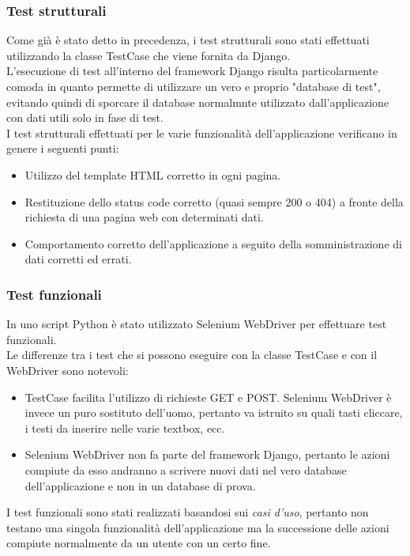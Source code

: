 \documentclass[10pt,a4paper]{report}
\begin{document}
	\subsubsection{Test strutturali}
	Come già è stato detto in precedenza, i test strutturali sono stati effettuati utilizzando la classe TestCase che viene fornita da Django. \\
	L'esecuzione di test all'interno del framework Django risulta particolarmente comoda in quanto permette di utilizzare un vero e proprio "database di test", evitando quindi di sporcare il database normalmnte utilizzato dall'applicazione con dati utili solo in fase di test. \\
	I test strutturali effettuati per le varie funzionalità dell'applicazione verificano in genere i seguenti punti:
	\begin{itemize}
		\item Utilizzo del template HTML corretto in ogni pagina.
		\item Restituzione dello status code corretto (quasi sempre 200 o 404) a fronte della richiesta di una pagina web con determinati dati.
		\item Comportamento corretto dell'applicazione a seguito della somministrazione di dati corretti ed errati.
	\end{itemize}

	\subsubsection{Test funzionali}
	In uno script Python è stato utilizzato Selenium WebDriver per effettuare test funzionali. \\
	Le differenze tra i test che si possono eseguire con la classe TestCase e con il WebDriver sono notevoli:
	\begin{itemize}
		\item TestCase facilita l'utilizzo di richieste GET e POST. Selenium WebDriver è invece un puro sostituto dell'uomo, pertanto va istruito su quali tasti cliccare, i testi da inserire nelle varie textbox, ecc.
		\item Selenium WebDriver non fa parte del framework Django, pertanto le azioni compiute da esso andranno a scrivere nuovi dati nel vero database dell'applicazione e non in un database di prova.
	\end{itemize}
	I test funzionali sono stati realizzati basandosi sui \textit{casi d'uso}, pertanto non testano una singola funzionalità dell'applicazione ma la successione delle azioni compiute normalmente da un utente con un certo fine.
	
\end{document}
